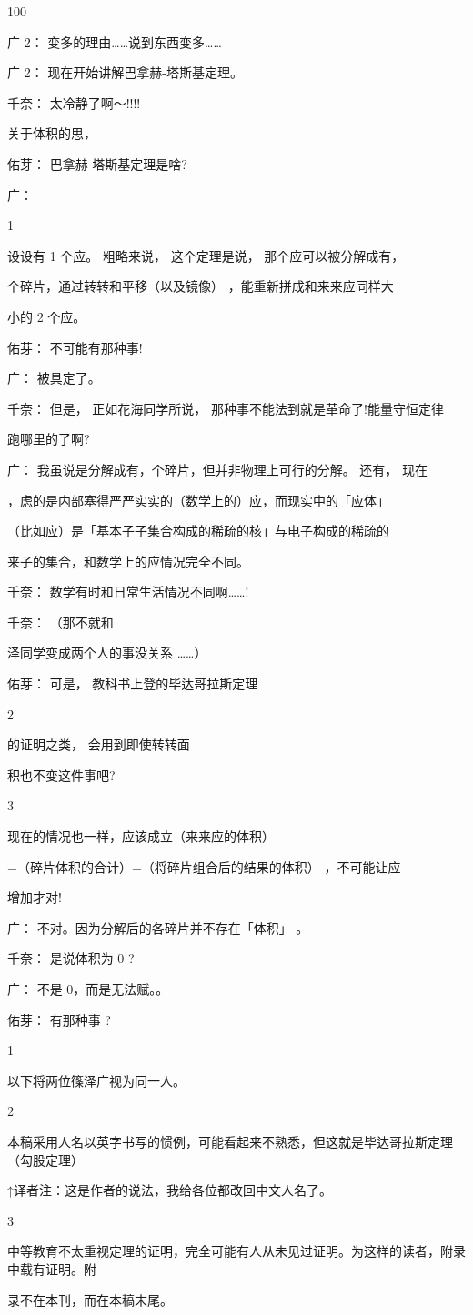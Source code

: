 100\par
广 2： 变多的理由……说到东西变多……\par
广 2： 现在开始讲解巴拿赫-塔斯基定理。\par
千奈： 太冷静了啊～!!!!\par
关于体积的思，\par
佑芽： 巴拿赫-塔斯基定理是啥?\par
广：\par
1\par
设设有 1 个应。 粗略来说， 这个定理是说， 那个应可以被分解成有，\par
个碎片，通过转转和平移（以及镜像） ，能重新拼成和来来应同样大\par
小的 2 个应。\par
佑芽： 不可能有那种事!\par
广： 被具定了。\par
千奈： 但是， 正如花海同学所说， 那种事不能法到就是革命了!能量守恒定律\par
跑哪里的了啊?\par
广： 我虽说是分解成有，个碎片，但并非物理上可行的分解。 还有， 现在\par
，虑的是内部塞得严严实实的（数学上的）应，而现实中的「应体」\par
（比如应）是「基本子子集合构成的稀疏的核」与电子构成的稀疏的\par
来子的集合，和数学上的应情况完全不同。\par
千奈： 数学有时和日常生活情况不同啊……!\par
千奈： （那不就和\par
泽同学变成两个人的事没关系 ……）\par
佑芽： 可是， 教科书上登的毕达哥拉斯定理\par
2\par
的证明之类， 会用到即使转转面\par
积也不变这件事吧?\par
3\par
现在的情况也一样，应该成立（来来应的体积）\par
=（碎片体积的合计）=（将碎片组合后的结果的体积） ，不可能让应\par
增加才对!\par
广： 不对。因为分解后的各碎片并不存在「体积」 。\par
千奈： 是说体积为 0  ?\par
广： 不是 0，而是无法赋。。\par
佑芽： 有那种事 ?\par
1\par
以下将两位篠泽广视为同一人。\par
2\par
本稿采用人名以英字书写的惯例，可能看起来不熟悉，但这就是毕达哥拉斯定理（勾股定理）\par
↑译者注：这是作者的说法，我给各位都改回中文人名了。\par
3\par
中等教育不太重视定理的证明，完全可能有人从未见过证明。为这样的读者，附录中载有证明。附\par
录不在本刊，而在本稿末尾。\par

